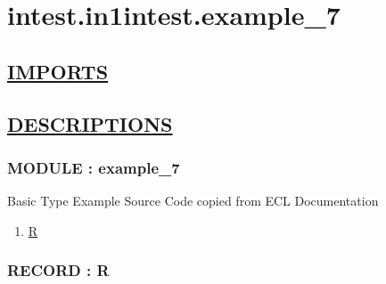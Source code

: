 \chapter*{intest.in1intest.example\_7}

\section*{\underline{IMPORTS}}

\section*{\underline{DESCRIPTIONS}}
\subsection*{MODULE : example\_7}
\hypertarget{ecldoc:intest.in1intest.example_7_intest.in1intest.example_7}{}
Basic Type Example Source Code copied from ECL Documentation \\
\begin{enumerate}
\item \hyperlink{ecldoc:intest.in1intest.example_7_intest.in1intest.example_7.r}{R}
\end{enumerate}
\subsection*{RECORD : R}
\hypertarget{ecldoc:intest.in1intest.example_7_intest.in1intest.example_7.r}{}

